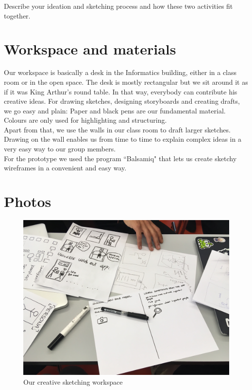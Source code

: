 \documentclass[12pt]{scrartcl}
\begin{document}
	Describe your ideation and sketching process and how these two activities fit together.
	

\section{Workspace and materials}

	Our workspace is basically a desk in the Informatics building, either in a class room or in the open space. The desk is mostly rectangular 
	but we sit around it as if it was King Arthur's round table. In that way, everybody can contribute his creative ideas. For drawing sketches, 
	designing storyboards and creating drafts, we go easy and plain: Paper and black pens are our fundamental material. 
	Colours are only used for highlighting and structuring.\\
	
	Apart from that, we use the walls in our class room to draft larger sketches. Drawing on the wall enables us from time to time to explain 
	complex ideas in a very easy way to our group members.\\
	
	For the prototype we used the program ``Balsamiq" that lets us create sketchy wireframes in a convenient and easy way.
	
\section{Photos}

	
	\begin{figure}[H]
        		\centering
       		\includegraphics[width=\textwidth]{../images/group1.jpg}
       		\caption{Our creative sketching workspace}
        		\label{group1}
	\end{figure}
	
\end{document}

